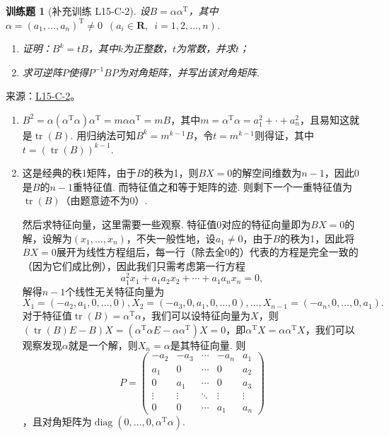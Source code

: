 \documentclass[12pt,fontset=fandol]{ctexart}
\newtheorem{exercise}{训练题}[section]
\begin{document}
\begin{exercise}[补充训练 L15-C-2]\label{prob:L15-C-2}
设$B=\alpha\alpha^\mathrm{T}$，其中$\alpha=(a_1,\ldots,a_n)^\mathrm{T}\neq 0\enspace(a_i\in\mathbf{R},\enspace i=1,2,\ldots,n)$.
        \begin{enumerate}
            \item 证明：$B^k=tB$，其中$k$为正整数，$t$为常数，并求$t$；

            \item 求可逆阵$P$使得$P^{-1}BP$为对角矩阵，并写出该对角矩阵.
        \end{enumerate}
\end{exercise}
\noindent 来源：\href{https://github.com/yhwu-is/Linear-Algebra-Left-Undone/blob/new/%E8%AE%B2%E4%B9%89/%E4%B8%93%E9%A2%98/15%20%E7%9B%B8%E4%BC%BC%E6%A0%87%E5%87%86%E5%BD%A2%EF%BC%9A%E5%A4%8D%E6%95%B0%E5%9F%9F%E4%B8%8A%E7%9A%84%E5%B0%9D%E8%AF%95%E4%B8%8E%E7%90%86%E8%AE%BA.tex}{L15-C-2}。
\begin{solve}
\begin{enumerate}
                \item $B^2=\alpha(\alpha^\mathrm{T}\alpha)\alpha^\mathrm{T}=m\alpha\alpha^\mathrm{T}=mB$，其中$m=\alpha^\mathrm{T}\alpha=a_1^2+\cdot+a_n^2$，且易知这就是$\operatorname{tr}(B)$. 用归纳法可知$B^k=m^{k-1}B$，令$t=m^{k-1}$则得证，其中$t=(\operatorname{tr}(B))^{k-1}$.

                \item 这是经典的秩1矩阵，由于$B$的秩为1，则$BX=0$的解空间维数为$n-1$，因此0是$B$的$n-1$重特征值. 而特征值之和等于矩阵的迹. 则剩下一个一重特征值为$\operatorname{tr}(B)$（由题意迹不为0）.

                      然后求特征向量，这里需要一些观察. 特征值0对应的特征向量即为$BX=0$的解，设解为$(x_1,\ldots,x_n)$，不失一般性地，设$a_1\neq 0$，由于$B$的秩为1，因此将$BX=0$展开为线性方程组后，每一行（除去全0的）代表的方程是完全一致的（因为它们成比例），因此我们只需考虑第一行方程
                      \[a_1^2x_1+a_1a_2x_2+\cdots+a_1a_nx_n=0,\]
                      解得$n-1$个线性无关特征向量为
                      \[X_1=(-a_2,a_1,0,\ldots,0),X_2=(-a_3,0,a_1,0,\ldots,0),\ldots,X_{n-1}=(-a_n,0,\ldots,0,a_1).\]
                      对于特征值$\operatorname{tr}(B)=\alpha^\mathrm{T}\alpha$，我们可以设特征向量为$X$，则$(\operatorname{tr}(B)E-B)X=(\alpha^\mathrm{T}\alpha E-\alpha\alpha^\mathrm{T})X=0$，即$\alpha^\mathrm{T}X=\alpha\alpha^\mathrm{T}X$，我们可以观察发现$\alpha$就是一个解，则$X_n=\alpha$是其特征向量. 则
\[P=\begin{pmatrix}
                              -a_2 & -a_3 & \cdots & -a_n & a_1 \\ a_1 & 0 & \cdots & 0 & a_2 \\ 0 & a_1 & \cdots & 0 & a_3 \\ \vdots & \vdots & \ddots & \vdots & \vdots \\ 0 & 0 & \cdots & a_1 & a_n
                          \end{pmatrix}\]
，且对角矩阵为$\operatorname{diag}(0,\ldots,0,\alpha^\mathrm{T}\alpha)$.
            \end{enumerate}
\end{solve}
\end{document}
